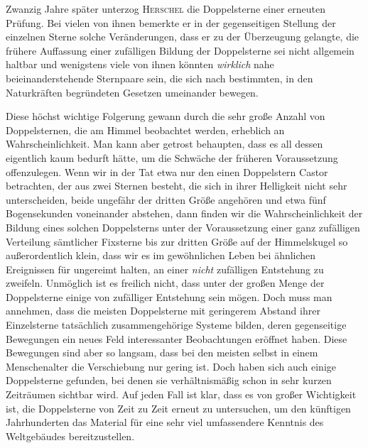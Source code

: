 Zwanzig Jahre später unterzog \textsc{Herschel} die Doppelsterne einer erneuten Prüfung. Bei vielen von ihnen bemerkte er in der gegenseitigen Stellung der einzelnen Sterne solche Veränderungen, dass er zu der Überzeugung gelangte, die frühere Auffassung einer zufälligen Bildung der Doppelsterne sei nicht allgemein haltbar und wenigstens viele von ihnen könnten \emph{wirklich} nahe beieinanderstehende Sternpaare sein, die sich nach bestimmten, in den Naturkräften begründeten Gesetzen umeinander bewegen.

Diese höchst wichtige Folgerung gewann durch die sehr große Anzahl von Doppelsternen, die am Himmel beobachtet werden, erheblich an Wahrscheinlichkeit. Man kann aber getrost behaupten, dass es all dessen eigentlich kaum bedurft hätte, um die Schwäche der früheren Voraussetzung offenzulegen. Wenn wir in der Tat etwa nur den einen Doppelstern Castor betrachten, der aus zwei Sternen besteht, die sich in ihrer Helligkeit nicht sehr unterscheiden, beide ungefähr der dritten Größe angehören und etwa fünf Bogensekunden voneinander abstehen, dann finden wir die Wahrscheinlichkeit der Bildung eines solchen Doppelsterns unter der Voraussetzung einer ganz zufälligen Verteilung sämtlicher Fixsterne bis zur dritten Größe auf der Himmelskugel so außerordentlich klein, dass wir es im gewöhnlichen Leben bei ähnlichen Ereignissen für ungereimt halten, an einer \emph{nicht} zufälligen Entstehung zu zweifeln. Unmöglich ist es freilich nicht, dass unter der großen Menge der Doppelsterne einige von zufälliger Entstehung sein mögen. Doch muss man annehmen, dass die meisten Doppelsterne mit geringerem Abstand ihrer Einzelsterne tatsächlich zusammengehörige Systeme bilden, deren gegenseitige Bewegungen ein neues Feld interessanter Beobachtungen eröffnet haben. Diese Bewegungen sind aber so langsam, dass bei den meisten selbst in einem Menschenalter die Verschiebung nur gering ist. Doch haben sich auch einige Doppelsterne gefunden, bei denen sie verhältnismäßig schon in sehr kurzen Zeiträumen sichtbar wird. Auf jeden Fall ist klar, dass es von großer Wichtigkeit ist, die Doppelsterne von Zeit zu Zeit erneut zu untersuchen, um den künftigen Jahrhunderten das Material für eine sehr viel umfassendere Kenntnis des Weltgebäudes bereitzustellen.

